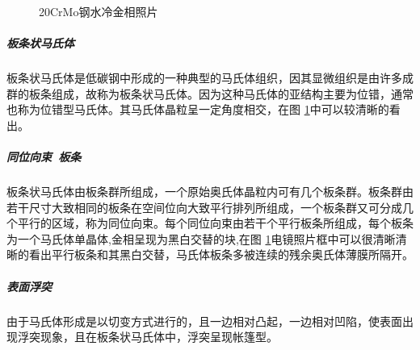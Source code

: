 \documentclass[12pt]{ctexart}
\begin{document}
\begin{figure}[h]
\centering
{}
\caption{20CrMo钢水冷金相照片}
\label{20water}
\end{figure}
\subparagraph{板条状马氏体}
板条状马氏体是低碳钢中形成的一种典型的马氏体组织，因其显微组织是由许多成群的板条组成，故称为板条状马氏体。因为这种马氏体的亚结构主要为位错，通常也称为位错型马氏体。其马氏体晶粒呈一定角度相交，在图 \ref{20water}中可以较清晰的看出。
\subparagraph{同位向束\  板条}
板条状马氏体由板条群所组成，一个原始奥氏体晶粒内可有几个板条群。板条群由若干尺寸大致相同的板条在空间位向大致平行排列所组成，一个板条群又可分成几个平行的区域，称为同位向束。每个同位向束由若干个平行板条所组成，每个板条为一个马氏体单晶体,金相呈现为黑白交替的块,在图 \ref{20water}电镜照片框中可以很清晰清晰的看出平行板条和其黑白交替，马氏体板条多被连续的残余奥氏体薄膜所隔开。
\subparagraph{表面浮突}
由于马氏体形成是以切变方式进行的，且一边相对凸起，一边相对凹陷，使表面出现浮突现象，且在板条状马氏体中，浮突呈现帐篷型。
\end{document}
